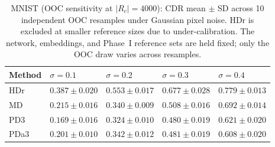 \begin{table}[htbp]
\centering
\caption{MNIST (OOC sensitivity at $|R_c|=4000$): CDR mean
$\pm$ SD across 10 independent OOC resamples under Gaussian
pixel noise. HDr is excluded at smaller reference sizes due to
under-calibration. The network, embeddings, and Phase~I reference
sets are held fixed; only the OOC draw varies across resamples.}
\label{tab:mnist-sensitivity}
\small
\begin{tabular}{l l l l l}
\toprule
Method & {$\sigma=0.1$} & {$\sigma=0.2$} & {$\sigma=0.3$} & {$\sigma=0.4$} \\
\midrule
  HDr & $0.387 \pm 0.020$ & $0.553 \pm 0.017$ & $0.677 \pm 0.028$ & $0.779 \pm 0.013$ \\
  MD & $0.215 \pm 0.016$ & $0.340 \pm 0.009$ & $0.508 \pm 0.016$ & $0.692 \pm 0.014$ \\
  PD3 & $0.169 \pm 0.016$ & $0.324 \pm 0.010$ & $0.480 \pm 0.019$ & $0.621 \pm 0.020$ \\
  PDa3 & $0.201 \pm 0.010$ & $0.342 \pm 0.012$ & $0.481 \pm 0.019$ & $0.608 \pm 0.020$ \\
\bottomrule
\end{tabular}
\end{table}
